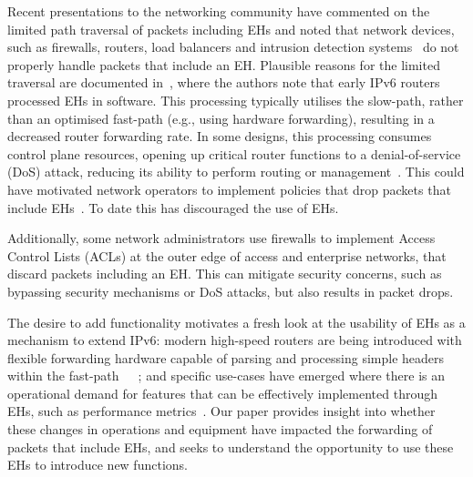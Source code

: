 \documentclass[conference]{IEEEtran}
\begin{document}
Recent presentations to the networking community have commented on the limited
path traversal of packets including EHs and noted that network devices, such as
firewalls, routers, load balancers and intrusion detection
systems~\cite{nalini-iepg114, fernando-talk} do not properly handle packets
that include an EH. 
Plausible reasons for the limited traversal are documented
in~\cite{ietf-v6ops-hbh-03}, where the authors note that early IPv6 routers
processed EHs in software. This processing typically utilises the slow-path,
rather than an optimised fast-path (e.g., using hardware forwarding), resulting
in a decreased router forwarding rate. In some designs, this processing
consumes control plane resources, opening up critical router functions to a denial-of-service (DoS) attack, reducing its ability to perform routing or management~\cite{naagas2021deh}. This could have motivated network operators to implement policies that
drop packets that include EHs~\cite{rfc9098}.  To date this has discouraged the use
of EHs. 

Additionally, some network administrators use firewalls to implement Access
Control Lists (ACLs) at the outer edge of access and enterprise networks, that
discard packets including an EH. This can mitigate security concerns, such as
bypassing security mechanisms or DoS
attacks, but also results in packet drops.


The desire to add functionality motivates a fresh look at the usability of EHs
as a mechanism to extend IPv6: modern high-speed routers are being introduced
with flexible forwarding hardware capable of parsing and processing simple
headers within the fast-path~\cite{programmable-data-plane}~\cite{cisco-silicon-one}~\cite{hauser2023}; and specific use-cases have emerged where there is an operational
demand for features that can be effectively implemented through EHs, such as performance metrics~\cite{ietf-ippm-ioam-ipv6-options-12}. Our
paper provides insight into whether these changes in operations and equipment
have impacted the forwarding of packets that include EHs, and seeks to
understand the opportunity to use these EHs to introduce new functions. 
\end{document}
